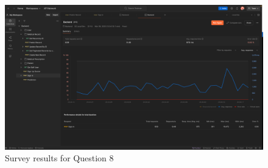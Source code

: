 \documentclass[12pt, titlepage]{article}
\begin{document}
\begin{figure}[ht!]
  \centering
  \includegraphics[scale=0.47]{../assets/Perf2.png}
  \caption{Survey results for Question 8}
  \label{fig:survey8}
\end{figure}
\end{document}
